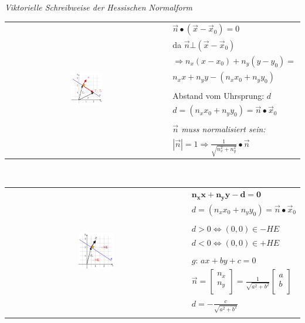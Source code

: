 \textit{Viktorielle Schreibweise der Hessischen Normalform}
\begin{tabular}{cl}
    \multirow{10}{*}{
        \includegraphics[width=0.2\textwidth]{assets/hessischenormalform.png}
    }
     & $\vec{n} \bullet (\vec{x} - \vec{x}_0) = 0$ \\
     & da $\vec{n} \bot (\vec{x} - \vec{x}_0)$ \\
     & $\Rightarrow n_x(x - x_0) + n_y(y - y_0) = $\\
     & $n_x x + n_y y - (n_x x_0 + n_y y_0)$\\
     & \\
     & Abstand vom Uhrsprung: $d$ \\
     & $d = (n_x x_0 + n_y y_0) = \vec{n} \bullet \vec{x}_0$\\
     & \\
     & \textit{$\vec{n}$ muss normalisiert sein:} \\
     & $|\vec{n}| = 1 \Rightarrow \frac{1}{\sqrt{n_x^2 + n_y^2}} \bullet \vec{n}$ \\
\end{tabular} \\

\begin{tabular}{cl}
    \multirow{10}{*}{
        \includegraphics[width=0.2\textwidth]{assets/hessischenormalfromebene.png}
    }
     & $\mathbf{n_x x + n_y y - d = 0}$ \\
     & $d = (n_x x_0 + n_y y_0) = \vec{n} \bullet \vec{x}_0$\\
     & \\
     & $d > 0 \Leftrightarrow (0,0) \in -HE $ \\
     & $d < 0 \Leftrightarrow (0,0) \in +HE $ \\
     & \\
     & $g$: $ax + by + c = 0$\\
     & $\vec{n} = \begin{bmatrix}
         n_x \\
         n_y \\
     \end{bmatrix} = \frac{1}{\sqrt{a^2 + b^2}} \begin{bmatrix}
         a \\
         b \\
     \end{bmatrix}$ \\
     & $d = - \frac{c}{\sqrt{a^2 + b^2}}$ \\
     & \\
\end{tabular}

